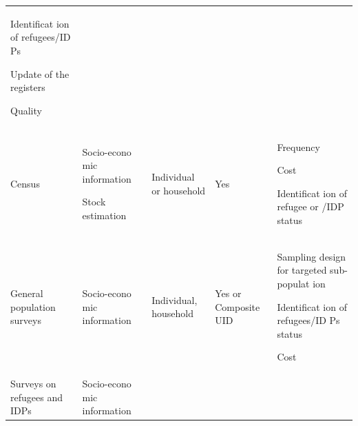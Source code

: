 \documentclass[
]{article}
\begin{document}
\begin{longtable}[]{@{}lllll@{}}
\begin{minipage}[t]{0.17\columnwidth}
Identificat
ion
of
refugees/ID
Ps

Update of
the
registers

Quality\strut
\end{minipage}\tabularnewline
\begin{minipage}[t]{0.17\columnwidth}\raggedright
Census\strut
\end{minipage} & \begin{minipage}[t]{0.17\columnwidth}\raggedright
Socio-econo
mic
information

Stock
estimation\strut
\end{minipage} & \begin{minipage}[t]{0.17\columnwidth}\raggedright
Individual
or
household\strut
\end{minipage} & \begin{minipage}[t]{0.17\columnwidth}\raggedright
Yes\strut
\end{minipage} & \begin{minipage}[t]{0.17\columnwidth}\raggedright
Frequency

Cost

Identificat
ion
of refugee
or /IDP
status\strut
\end{minipage}\tabularnewline
\begin{minipage}[t]{0.17\columnwidth}\raggedright
General
population
surveys\strut
\end{minipage} & \begin{minipage}[t]{0.17\columnwidth}\raggedright
Socio-econo
mic
information\strut
\end{minipage} & \begin{minipage}[t]{0.17\columnwidth}\raggedright
Individual,
household\strut
\end{minipage} & \begin{minipage}[t]{0.17\columnwidth}\raggedright
Yes or
Composite
UID\strut
\end{minipage} & \begin{minipage}[t]{0.17\columnwidth}\raggedright
Sampling
design for
targeted
sub-populat
ion

Identificat
ion
of
refugees/ID
Ps
status

Cost\strut
\end{minipage}\tabularnewline
\begin{minipage}[t]{0.17\columnwidth}\raggedright
Surveys on
refugees
and IDPs\strut
\end{minipage} & \begin{minipage}[t]{0.17\columnwidth}\raggedright
Socio-econo
mic
information


\end{minipage}
\end{longtable}
\end{document}
